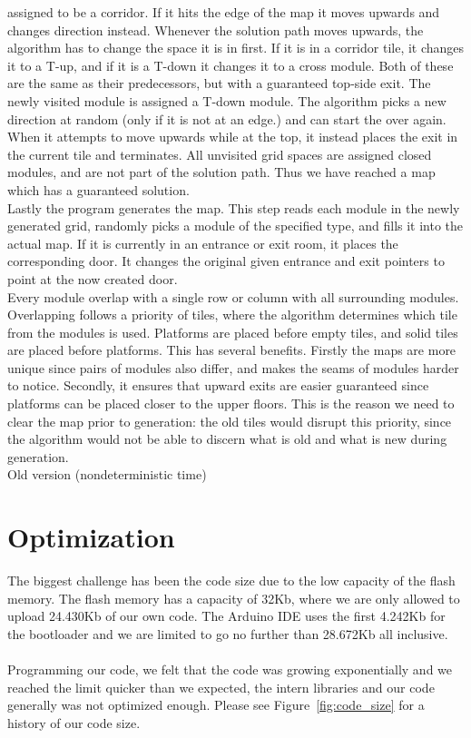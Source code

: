 assigned to be a corridor. If it hits the edge of the map it moves upwards and
changes direction instead. Whenever the solution path moves upwards, the
algorithm has to change the space it is in first. If it is in a corridor tile,
it changes it to a T-up, and if it is a T-down it changes it to a cross module.
Both of these are the same as their predecessors, but with a guaranteed
top-side exit. The newly visited module is assigned a T-down module. The
algorithm picks a new direction at random (only if it is not at an edge.) and
can start the over again. When it attempts to move upwards while at the top, it
instead places the exit in the current tile and terminates. All unvisited grid
spaces are assigned closed modules, and are not part of the solution path. Thus
we have reached a map which has a guaranteed solution.\\ Lastly the program
generates the map. This step reads each module in the newly generated grid,
randomly picks a module of the specified type, and fills it into the actual
map. If it is currently in an entrance or exit room, it places the
corresponding door. It changes the original given entrance and exit pointers to
point at the now created door.\\ Every module overlap with a single row or
column with all surrounding modules. Overlapping follows a priority of tiles,
where the algorithm determines which tile from the modules is used. Platforms
are placed before empty tiles, and solid tiles are placed before platforms.
This has several benefits. Firstly the maps are more unique since pairs of
modules also differ, and makes the seams of modules harder to notice. Secondly,
it ensures that upward exits are easier guaranteed since platforms can be
placed closer to the upper floors. This is the reason we need to clear the map
prior to generation: the old tiles would disrupt this priority, since the
algorithm would not be able to discern what is old and what is new during
generation.\\ Old version (nondeterministic time)

\section{Optimization}%
The biggest challenge has been the code size due
to the low capacity of the flash memory.  The flash memory has a capacity of
32Kb, where we are only allowed to upload 24.430Kb of our own code. The
Arduino IDE uses the first 4.242Kb for the bootloader and we are limited to go
no further than 28.672Kb all inclusive.  \\ \\ Programming our code, we felt
that the code was growing exponentially and we reached the limit quicker than
we expected, the intern libraries and our code generally was not optimized
enough. Please see Figure~\ref{fig:code_size} for a history of our code size.


